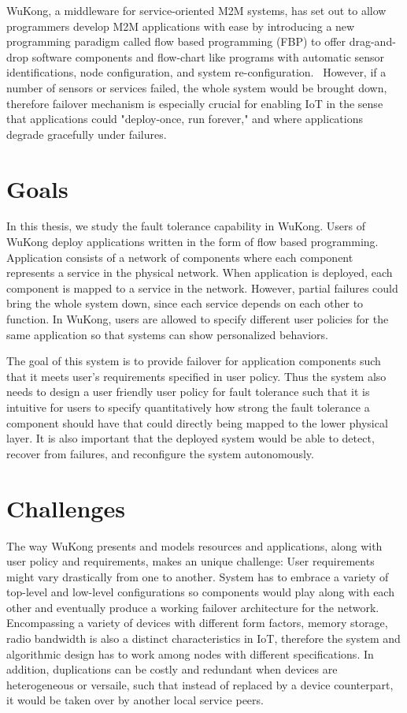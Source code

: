 WuKong, a middleware for service-oriented M2M systems, has set out to allow
programmers develop M2M applications with ease by introducing a new
programming paradigm called flow based programming (FBP) to offer drag-and-drop
software components and flow-chart like programs with automatic sensor
identifications, node configuration, and system re-configuration.~\cite{Reijers}
However, if a number of sensors or services failed, the whole system would be
brought down, therefore failover mechanism is especially crucial for enabling
IoT in the sense that applications could "deploy-once, run forever," and where
applications degrade gracefully under failures.


\section{Goals} %

In this thesis, we study the fault tolerance capability in WuKong.
Users of WuKong deploy applications written in the form of flow based
programming. Application consists of a network of components where each
component represents a service in the physical network. When application is deployed, each
component is mapped to a service in the network. However, partial failures could
bring the whole system down, since each service depends on each other to
function. In WuKong, users are allowed to specify different user policies for
the same application so that systems can show personalized behaviors. 

The goal of this system is to provide failover for application components such
that it meets user's requirements specified in user policy. Thus the system also
needs to design a user friendly user policy for fault tolerance such that it is
intuitive for users to specify quantitatively how strong the fault tolerance
a component should have that could directly being mapped to the lower physical
layer. It is also important that the deployed system would be
able to detect, recover from failures, and reconfigure the system autonomously. 


\section{Challenges}

The way WuKong presents and models resources and applications, along with user
policy and requirements, makes an unique challenge: User requirements might
vary drastically from one to another. System has to embrace a variety of
top-level and low-level configurations so components would play along with each
other and eventually produce a working failover architecture for the network.
Encompassing a variety of devices with different form factors, memory storage,
radio bandwidth is also a distinct characteristics in IoT,
therefore the system and algorithmic design has to work among nodes
with different specifications. In addition, duplications can be
costly and redundant when devices are heterogeneous or versaile,
such that instead of replaced by a device counterpart, it would be
taken over by another local service peers.

